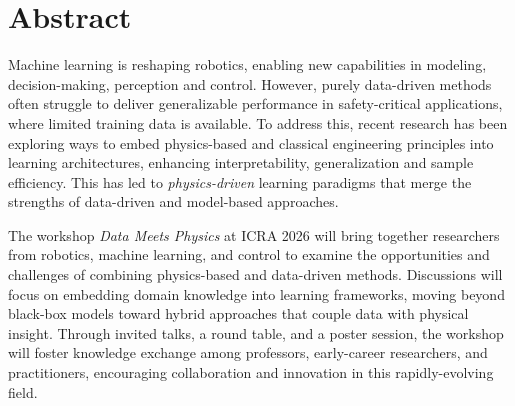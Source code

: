 \documentclass[12pt,a4paper]{article}
\newcommand{\revM}[1]{\textcolor{Red}{#1}}
\begin{document}
\section{Abstract} \label{sec_abstract}
%
Machine learning is reshaping robotics, enabling new capabilities in modeling, decision-making, perception and control. However, purely data-driven methods often struggle to deliver generalizable performance in safety-critical applications, where limited training data is available. To address this, recent research has been exploring ways to embed physics-based and classical engineering principles into learning architectures, enhancing interpretability, generalization and sample efficiency. This has led to \textit{physics-driven} learning paradigms that merge the strengths of data-driven and model-based approaches. 

The workshop \textit{Data Meets Physics} at ICRA 2026 will bring together researchers from robotics, machine learning, and control to examine the opportunities and challenges of combining physics-based and data-driven methods. Discussions will focus on embedding domain knowledge into learning frameworks, moving beyond black-box models toward hybrid approaches that couple data with physical insight. Through invited talks, a round table, and a poster session, the workshop will foster knowledge exchange among professors, early-career researchers, and practitioners, encouraging collaboration and innovation in this rapidly-evolving field.
%
\end{document}
